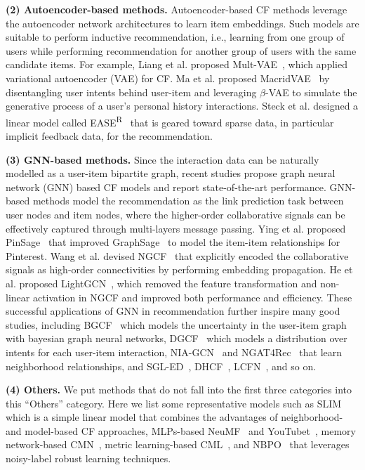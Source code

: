 \documentclass[sigconf,authorversion]{acmart}
\begin{document}
\textbf{(2) Autoencoder-based methods.}
Autoencoder-based CF methods leverage the autoencoder network architectures to learn item embeddings. Such models are suitable to perform inductive recommendation, i.e., learning from one group of users while performing recommendation for another group of users with the same candidate items. For example, 
Liang et al. proposed Mult-VAE~\cite{MVAE}, which applied variational autoencoder (VAE) for CF. 
Ma et al. proposed MacridVAE~\cite{MacridVAE} by disentangling user intents behind user-item and leveraging $\beta$-VAE to simulate the generative process of a user’s personal history interactions.
Steck et al. designed a linear model called EASE\textsuperscript{R}~\cite{EASE} that is geared toward sparse data, in particular implicit feedback data, for the recommendation.

\textbf{(3) GNN-based methods.}
Since the interaction data can be naturally modelled as a user-item bipartite graph, 
recent studies propose graph neural network (GNN) based CF models and report state-of-the-art performance.
GNN-based methods model the recommendation as the link prediction task between user nodes and item nodes, 
where the higher-order collaborative signals can be effectively captured through multi-layers message passing.
Ying et al. proposed PinSage~\cite{PinSage} that improved GraphSage~\cite{hamilton2017inductive} to model the item-item relationships for Pinterest.
Wang et al. devised NGCF~\cite{NGCF} that explicitly encoded the collaborative signals as high-order connectivities by performing embedding propagation.
He et al. proposed LightGCN~\cite{LightGCN}, which removed the feature transformation and non-linear activation in NGCF and improved both performance and efficiency.
These successful applications of GNN in recommendation further inspire many good studies, including BGCF~\cite{BGCF} which models the uncertainty in the user-item graph with bayesian graph neural networks, DGCF~\cite{DGCF} which models a distribution over intents for each user-item interaction, NIA-GCN~\cite{NIA-GCN} and NGAT4Rec~\cite{NGAT4Rec} that learn neighborhood relationships, and SGL-ED~\cite{SGL-ED}, DHCF~\cite{DHCF}, LCFN~\cite{LCFN}, and so on.










\textbf{(4) Others.}
We put methods that do not fall into the first three categories into this ``Others'' category. Here we list some representative models such as SLIM~\cite{SLIM} which is a simple linear model that combines the advantages of neighborhood- and model-based CF approaches, MLPs-based NeuMF~\cite{NeuMF} and YouTubet~\cite{YouTubeNet},  memory network-based CMN~\cite{CMN}, metric learning-based CML~\cite{CML}, and NBPO~\cite{NBPO} that leverages noisy-label robust learning techniques.
\end{document}
